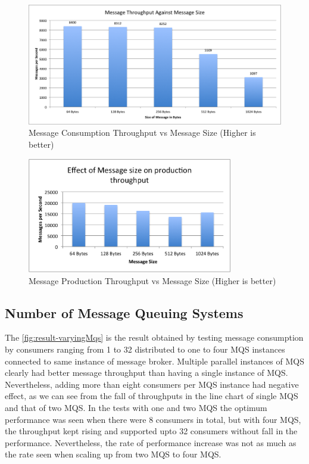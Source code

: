 \begin{figure}[H]
  \centering  \includegraphics[width=1\textwidth]{figures/02consumptionMessageSize}
  \caption[Message Consumption Throughput vs Message Size]{Message Consumption Throughput vs Message Size (Higher is better)}
  \label{fig:result-consumptionMessageSize}
\end{figure}

\begin{figure}[H]
  \centering  \includegraphics[width=0.8\textwidth]{figures/03productionMessageSize}
  \caption[Message Production Throughput vs Message Size]{Message Production Throughput vs Message Size (Higher is better)}
  \label{fig:result-productionMessageSize}
\end{figure}

\subsection{Number of Message Queuing Systems}
  The \autoref{fig:result-varyingMqs} is the result obtained by testing message consumption by consumers ranging from 1 to 32 distributed to one to four MQS instances connected to same instance of message broker. Multiple parallel instances of MQS clearly had better message throughput than having a single instance of MQS. Nevertheless, adding more than eight consumers per MQS instance had negative effect, as we can see from the fall of throughputs in the line chart of single MQS and that of two MQS. In the tests with one and two MQS the optimum performance was seen when there were 8 consumers in total, but with four MQS, the throughput kept rising and supported upto 32 consumers without fall in the performance. Nevertheless, the rate of performance increase was not as much as the rate seen when scaling up from two MQS to four MQS.

